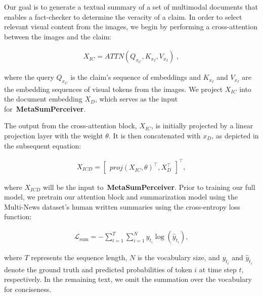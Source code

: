 Our goal is to generate a textual summary of a set of multimodal documents that enables a fact-checker to determine the veracity of a claim. In order to select relevant visual content from the images, we begin by performing a cross-attention between the images and the claim:

\begin{equation}
  \begin{array}{l}
    X_{IC}= ATTN(Q_{x_C}, K_{x_I}, V_{x_I}) \;,
  \end{array}
\end{equation}

where the query $Q_{x_C}$ is the claim's sequence of embeddings and $K_{x_I}$ and $V_{x_I}$ are the embedding sequences of visual tokens from the images. We project $X_{IC}$ into the document embedding $X_D$, which serves as the input for~\textbf{MetaSumPerceiver}.

The output from the cross-attention block, $X_{IC}$, is initially projected by a linear projection layer with the weight $\theta$. It is then concatenated with $x_D$, as depicted in the subsequent equation:

\begin{equation}
  \begin{array}{l}
  X_{ICD} = 
  \begin{bmatrix}
    proj(X_{IC}, \theta)^\intercal , X_D ^\intercal 
  \end{bmatrix}^\intercal,
  \end{array}
\end{equation}

where $X_{ICD}$ will be the input to~\textbf{MetaSumPerceiver}. Prior to training our full model, we pretrain our attention block and summarization model using the Multi-News dataset's human written summaries using the cross-entropy loss function:

\begin{equation}
  \begin{array}{l}
    \mathcal{L}_{\text{sum}} = -\sum_{t=1}^{T} \sum_{i=1}^{N} y_{t_i} \log(\hat{y}_{t_i}),
  \end{array}
\end{equation}

where $T$ represents the sequence length, $N$ is the vocabulary size, and $y_{t_i}$ and $\hat{y}_{t_i}$ denote the ground truth and predicted probabilities of token $i$ at time step $t$, respectively. In the remaining text, we omit the summation over the vocabulary for conciseness.